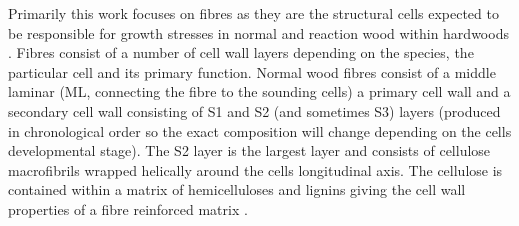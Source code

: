 Primarily this work focuses on fibres as they are the structural cells expected
to be responsible for growth stresses in normal and reaction wood within
hardwoods \cite{archer1987growth}. Fibres consist of a number of cell wall layers depending on
the species, the particular cell and its primary function. Normal wood fibres
consist of a middle laminar (ML, connecting the fibre to
the sounding cells) a primary cell wall and a secondary cell wall consisting of
S1 and S2 (and sometimes S3) layers (produced in chronological order so the exact composition
will change depending on the cells developmental stage)\cite{barnett1981xylem}. The S2 layer is
the largest layer and consists of cellulose macrofibrils wrapped helically
around the cells longitudinal axis. The cellulose is contained within a
matrix of hemicelluloses and lignins giving the cell wall properties
of a fibre reinforced matrix \cite{niklas2012plant}.